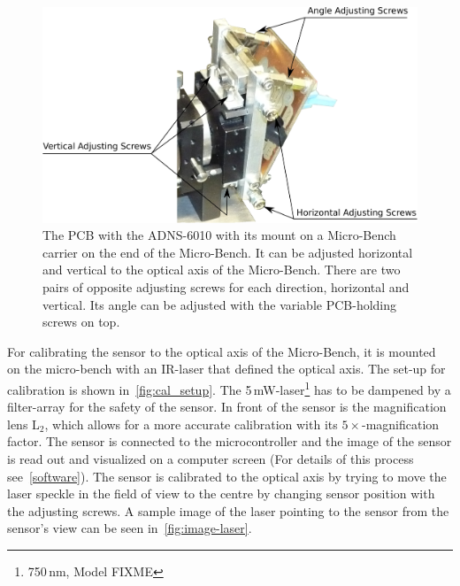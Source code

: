 \documentclass[12pt,a4paper]{article}
\begin{document}
\begin{figure}[htbp]
\begin{center}
\includegraphics[width=1\columnwidth]{figures/sens-mount.pdf}
\caption{\label{fig:sens-mount}
The PCB with the ADNS-6010 with its mount on a Micro-Bench carrier on the end of the Micro-Bench.
It can be adjusted horizontal and vertical to the optical axis of the Micro-Bench.
There are two pairs of opposite adjusting screws for each direction, horizontal and vertical.
Its angle can be adjusted with the variable PCB-holding screws on top.
}
\end{center}
\end{figure}

For calibrating the sensor to the optical axis of the Micro-Bench, it is mounted on the micro-bench with an IR-laser that defined the optical axis.
The set-up for calibration is shown in~\autoref{fig:cal_setup}.
The 5\,mW-laser\footnote{750\,nm, Model FIXME} has to be dampened by a filter-array for the safety of the sensor.
In front of the sensor is the magnification lens L$_2$, which allows for a more accurate calibration with its $5\times$-magnification factor.
The sensor is connected to the microcontroller and the image of the sensor is read out and visualized on a computer screen (For details of this process see~\autoref{software}).
The sensor is calibrated to the optical axis by trying to move the laser speckle in the field of view to the centre by changing sensor position with the adjusting screws.
A sample image of the laser pointing to the sensor from the sensor's view can be seen in~\autoref{fig:image-laser}.
\end{document}
